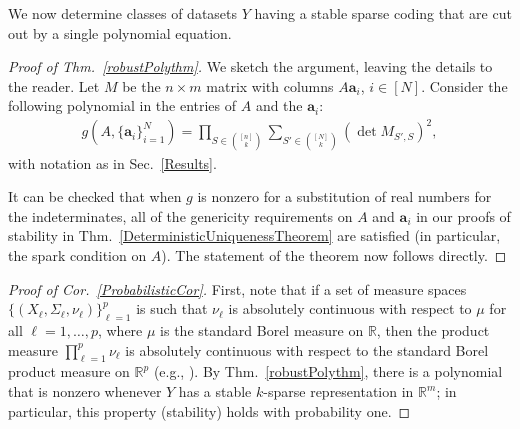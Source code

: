 \documentclass[journal, twocolumn]{IEEEtran}
\newtheorem{lemma}{Lemma}
\begin{document}
We now determine classes of datasets $Y$ having a stable sparse coding that are cut out by a single polynomial equation.

\begin{proof}[Proof of Thm.~\ref{robustPolythm}]
We sketch the argument, leaving the details to the reader.
Let $M$ be the $n \times m$ matrix with columns $A\mathbf{a}_i$, $i \in [N]$.  Consider the following polynomial \cite[Sec.~IV]{Hillar15} in the entries of $A$ and the $\mathbf{a}_i$:
\begin{align*}
g(A, \{\mathbf{a}_i\}_{i=1}^N) = \prod_{S \in {[n] \choose k}} \sum_{S' \in {[N] \choose k}} (\det M_{S',S})^2,
\end{align*}
with notation as in Sec.~\ref{Results}.  

It can be checked that when $g$ is nonzero for a substitution of real numbers for the indeterminates, all of the genericity requirements on $A$ and $\mathbf{a}_i$ in our proofs of stability in Thm.~\ref{DeterministicUniquenessTheorem} are satisfied (in particular, the spark condition on $A$). The statement of the theorem now follows directly.
\end{proof}

 \begin{proof}[Proof of Cor.~\ref{ProbabilisticCor}]
First, note that if a set of measure spaces $\{(X_{\ell}, \Sigma_{\ell}, \nu_{\ell})\}_{\ell=1}^p$ is such that $\nu_{\ell}$ is absolutely continuous with respect to $\mu$ for all $\ell = 1, \ldots, p$, where $\mu$ is the standard Borel measure on $\mathbb{R}$, then the product measure $\prod_{\ell=1}^p \nu_{\ell}$ is absolutely continuous with respect to the standard Borel product measure on $\mathbb{R}^p$ (e.g.,  \cite[Ex. ***]{folland2013real}). By Thm.~\ref{robustPolythm}, there is a polynomial that is nonzero whenever $Y$ has a stable $k$-sparse representation in $\mathbb R^m$; in particular, this property (stability) holds with probability one.
\end{proof}
\end{document}
